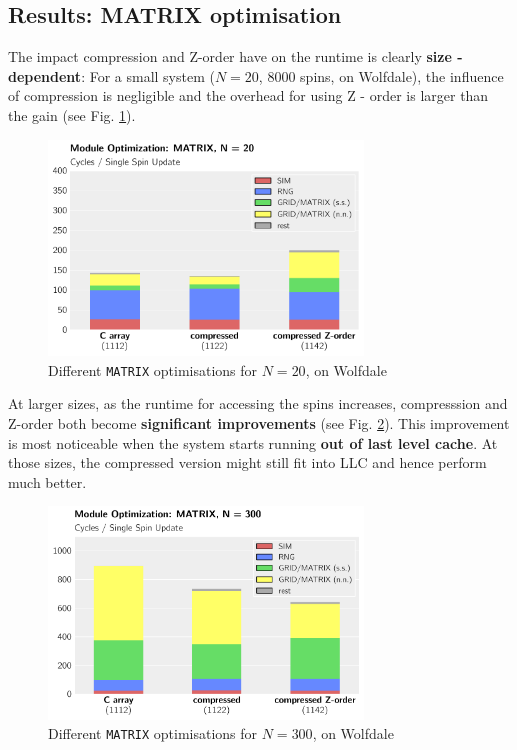 \documentclass[letterpaper]{article}
\begin{document}
\subsection{Results: MATRIX optimisation}
The impact compression and Z-order have on the runtime is clearly \textbf{size - dependent}: For a small system ($N = 20$, $8000$ spins, on Wolfdale), the influence of compression is negligible and the overhead for using Z - order is larger than the gain (see Fig. \ref{MATRIX:Wolf:20}).
	\begin{figure}[h]\centering
	  \includegraphics[width = 8.36cm]{plots/msk_20_3.pdf}
	  \caption{Different \texttt{MATRIX} optimisations for $N = 20$, on Wolfdale}
	  \label{MATRIX:Wolf:20}
	\end{figure}\newline
At larger sizes, as the runtime for accessing the spins increases, compresssion and Z-order both become \textbf{significant improvements} (see Fig. \ref{MATRIX:Wolf:300}). This improvement is most noticeable when the system starts running \textbf{out of last level cache}. At those sizes, the compressed version might still fit into LLC and hence perform much better.
	\begin{figure}[h]\centering
	  \includegraphics[width = 8.36cm]{plots/msk_300_3.pdf}
	  \caption{Different \texttt{MATRIX} optimisations for $N = 300$, on Wolfdale}
	  \label{MATRIX:Wolf:300}
	\end{figure}\newline
\end{document}
